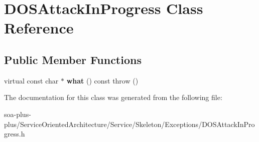 \hypertarget{class_d_o_s_attack_in_progress}{
\section{DOSAttackInProgress Class Reference}
\label{class_d_o_s_attack_in_progress}
}
\subsection*{Public Member Functions}
\begin{DoxyCompactItemize}
\item 
\hypertarget{class_d_o_s_attack_in_progress_a075536a668f2a033ddc7b225e29a1ee7}{
virtual const char $\ast$ {\bfseries what} () const   throw ()}
\label{class_d_o_s_attack_in_progress_a075536a668f2a033ddc7b225e29a1ee7}

\end{DoxyCompactItemize}


The documentation for this class was generated from the following file:\begin{DoxyCompactItemize}
\item 
soa-\/plus-\/plus/ServiceOrientedArchitecture/Service/Skeleton/Exceptions/DOSAttackInProgress.h\end{DoxyCompactItemize}
